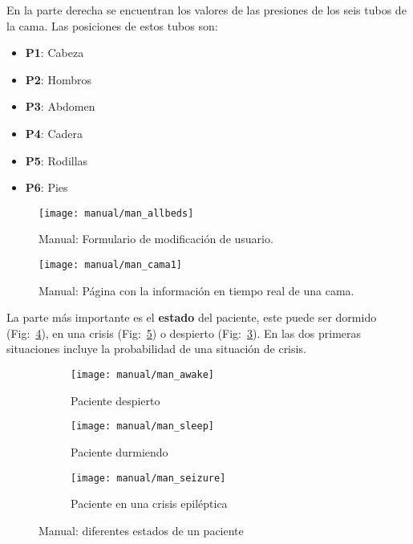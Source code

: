 En la parte derecha se encuentran los valores de las presiones de los seis tubos de la cama. Las posiciones de estos tubos son:
\begin{itemize}
	\item \textbf{P1}: Cabeza
	\item \textbf{P2}: Hombros
	\item \textbf{P3}: Abdomen
	\item \textbf{P4}: Cadera
	\item \textbf{P5}: Rodillas
	\item \textbf{P6}: Pies
\end{itemize}

\begin{figure}
	\centering
	\texttt{[image: manual/man\_allbeds]}
	\caption{Manual: Formulario de modificación de usuario.}
	\label{fig:man_bedlist}
\end{figure}

\begin{figure}
	\centering
	\texttt{[image: manual/man\_cama1]}
	\caption{Manual: Página con la información en tiempo real de una cama.}
	\label{fig:man_bed}
\end{figure}

La parte más importante es el \textbf{estado} del paciente, este puede ser dormido (Fig:~\ref{fig:man_dormido}), en una crisis (Fig:~\ref{fig:man_crisis}) o despierto (Fig:~\ref{fig:man_despiertos}). En las dos primeras situaciones incluye la probabilidad de una situación de crisis.

\begin{figure}
	\centering
	\begin{subfigure}[b]{0.48\textwidth}
		\centering
		\texttt{[image: manual/man\_awake]}
		\caption{Paciente despierto}
		\label{fig:man_despiertos}
	\end{subfigure}
	\begin{subfigure}[b]{1\textwidth}
		\centering
		\texttt{[image: manual/man\_sleep]}
		\caption{Paciente durmiendo}
		\label{fig:man_dormido}
	\end{subfigure}
	\begin{subfigure}[b]{0.9\textwidth}
		\centering
		\texttt{[image: manual/man\_seizure]}
		\caption{Paciente en una crisis epiléptica}
		\label{fig:man_crisis}
	\end{subfigure}
	\caption{Manual: diferentes estados de un paciente}
	\label{fig:man_states}
\end{figure}

